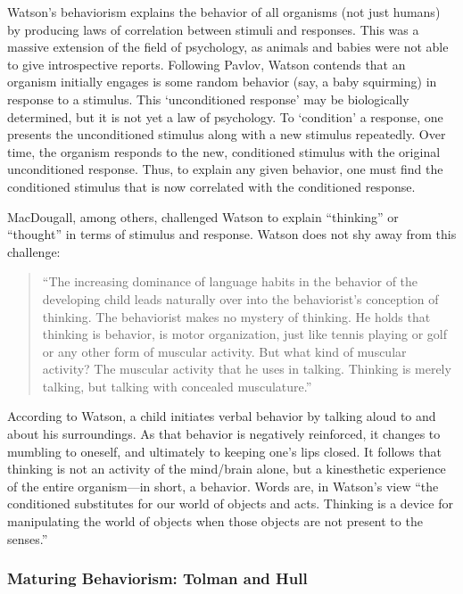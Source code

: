 \begin{refsection}
Watson's behaviorism explains the behavior of all organisms (not just humans) by producing laws of correlation between stimuli and responses. This was a massive extension of the field of psychology, as animals and babies were not able to give introspective reports. Following Pavlov, Watson contends that an organism initially engages is some random behavior (say, a baby squirming) in response to a stimulus. This `unconditioned response' may be biologically determined, but it is not yet a law of psychology. To `condition' a response, one presents the unconditioned stimulus along with a new stimulus repeatedly. Over time, the organism responds to the new, conditioned stimulus with the original unconditioned response. Thus, to explain any given behavior, one must find the conditioned stimulus that is now correlated with the conditioned response.

MacDougall, among others, challenged Watson to explain ``thinking'' or ``thought'' in terms of stimulus and response. Watson does not shy away from this challenge:

\begin{quote}

``The increasing dominance of language habits in the behavior of the developing child leads naturally over into the behaviorist's conception of thinking. The behaviorist makes no mystery of thinking. He holds that thinking is behavior, is motor organization, just like tennis playing or golf or any other form of muscular activity. But what kind of muscular activity? The muscular activity that he uses in talking. Thinking is merely talking, but talking with concealed musculature.'' ~\citep[p. 464]{Watson:2013ty}
\end{quote}

According to Watson, a child initiates verbal behavior by talking aloud to and about his surroundings. As that behavior is negatively reinforced, it changes to mumbling to oneself, and ultimately to keeping one's lips closed. It follows that thinking is not an activity of the mind\slash brain alone, but a kinesthetic experience of the entire organism---in short, a behavior. Words are, in Watson's view ``the conditioned substitutes for our world of objects and acts. Thinking is a device for manipulating the world of objects when those objects are not present to the senses.'' ~\citep{Watson:iMwU-3B8}

\subsubsection{Maturing Behaviorism: Tolman and Hull}
\label{maturingbehaviorism:tolmanandhull}


\end{refsection}
